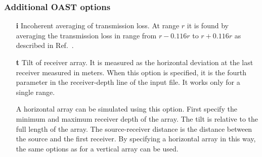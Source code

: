 \documentclass{saclantc}
\begin{document}
\subsubsection{Additional OAST options}
\begin{itemize}
 \item[\bf i]  Incoherent averaging of transmission loss.  At range
$r$ it is found  by averaging the
transmission loss in range from $r-0.116r$ to $ r+0.116r$ as described
in Ref.\ \cite{harrison:asa95}.
 \item[\bf t] Tilt of receiver array.  It is measured
as the horizontal deviation at the last receiver measured in
meters. When this option is specified, it is the fourth parameter in
the receiver-depth line of the input file.  It works only for
a single range.  

A horizontal array can be simulated using this option. First specify
the minimum and maximum receiver depth of the array. The tilt
is relative to the full length of the array. The source-receiver distance
is the distance between the source and the first receiver. By
specifying a horizontal array in this way, the same options as for a
vertical array can be used.
\end{itemize}
\end{document}
